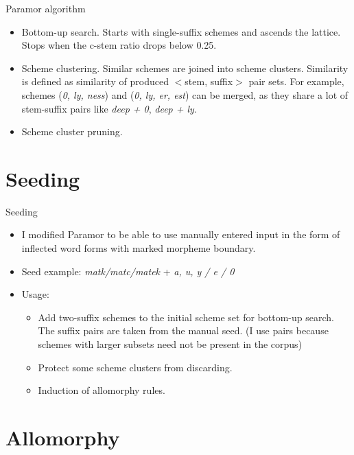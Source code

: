 \documentclass[hyperref={pdfencoding=unicode, unicode=true}, xcolor=dvipsnames]{beamer}
\begin{document}
\begin{frame}{Paramor algorithm}
\begin{itemize}
\item Bottom-up search. Starts with single-suffix schemes and ascends the lattice. Stops when the c-stem ratio drops below 0.25.
\item Scheme clustering. Similar schemes are joined into scheme clusters. Similarity is defined as similarity of produced $<$stem, suffix$>$ pair sets. For example, schemes (\emph{0, ly, ness}) and (\emph{0, ly, er, est}) can be merged, as they share a lot of stem-suffix pairs like \emph{deep + 0}, \emph{deep + ly}.
\item Scheme cluster pruning.
\end{itemize}
\end{frame}

\section{Seeding}

\begin{frame}{Seeding}
\begin{itemize}
\item I modified Paramor to be able to use manually entered input in the form of inflected word forms with marked morpheme boundary.
\item Seed example: \emph{matk/matc/matek} + \emph{a, u, y / e / 0}
\item Usage: \begin{itemize}
    \item Add two-suffix schemes to the initial scheme set for bottom-up search. The suffix pairs are taken from the manual seed. (I use pairs because schemes with larger subsets need not be present in the corpus)
    \item Protect some scheme clusters from discarding.
    \item Induction of allomorphy rules.
\end{itemize}
\end{itemize}
\end{frame}

\section{Allomorphy}
\end{document}
